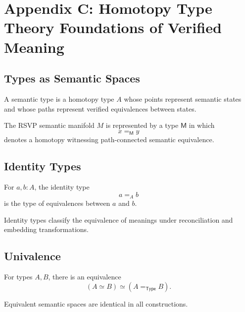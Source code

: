 \chapter*{Appendix C: Homotopy Type Theory Foundations of Verified Meaning}

\section{Types as Semantic Spaces}

\begin{definition}
A semantic type is a homotopy type $A$ whose points represent semantic states and whose paths represent verified equivalences between states.
\end{definition}

\begin{proposition}
The RSVP semantic manifold $M$ is represented by a type $\mathsf{M}$ in which
\[
x =_{\mathsf{M}} y
\]
denotes a homotopy witnessing path-connected semantic equivalence.
\end{proposition}

\section{Identity Types}

\begin{definition}
For $a,b : A$, the identity type
\[
a =_A b
\]
is the type of equivalences between $a$ and $b$.
\end{definition}

\begin{proposition}
Identity types classify the equivalence of meanings under reconciliation and embedding transformations.
\end{proposition}

\section{Univalence}

\begin{axiom}[Univalence]
For types $A,B$, there is an equivalence
\[
(A \simeq B) \simeq (A =_{\mathsf{Type}} B).
\]
\end{axiom}

\begin{corollary}
Equivalent semantic spaces are identical in all constructions.
\end{corollary}

